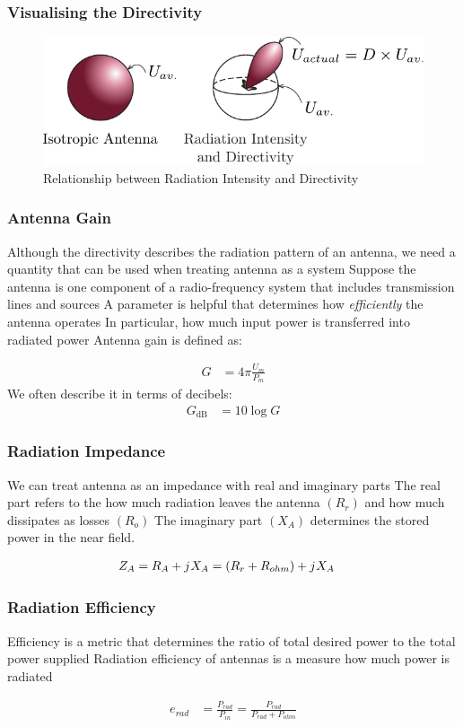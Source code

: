 \documentclass[10pt, compress]{beamer}
\renewcommand{\j}{{j}\mkern1mu} %
\begin{document}
\begin{frame}
  \frametitle{Visualising the Directivity}
  \begin{figure}
    \centering
    \includegraphics[width=.8\textwidth]{src/antenna_dir.pdf}
    \caption{Relationship between Radiation Intensity and Directivity}
  \end{figure}
\end{frame}


\begin{frame}
  \frametitle{Antenna Gain}
  \begin{outline}
    \1 Although the directivity describes the radiation pattern of an antenna, we need a quantity that can be used when treating antenna as a system
    \1 Suppose the antenna is one component of a radio-frequency system that includes transmission lines and sources
    \1 A parameter is helpful that determines how \textit{efficiently} the antenna operates
    \2 In particular, how much input power is transferred into radiated power
    \1 Antenna gain is defined as:
  \end{outline}
  \begin{align*}
    G &= 4 \pi \frac{U_m}{P_m}
  \end{align*}
  We often describe it in terms of decibels:
  \begin{align*}
    G_{\mathrm{dB}} &= 10 \log G
  \end{align*}
\end{frame}

\begin{frame}
  \frametitle{Radiation Impedance}
  \begin{outline}
    \1 We can treat antenna as an impedance with real and imaginary parts
    \2 The real part refers to the how much radiation leaves the antenna $(R_r)$ and how much dissipates as losses $(R_o)$
    \2 The imaginary part $(X_A)$ determines the stored power in the near field.
  \end{outline}
  \begin{align*}
    Z_A &= R_A + \j X_A = (R_r + R_{ohm}) + \j X_A
  \end{align*}
\end{frame}

\begin{frame}
  \frametitle{Radiation Efficiency}
  \begin{outline}
    \1 Efficiency is a metric that determines the ratio of total desired power to the total power supplied
    \1 Radiation efficiency of antennas is a measure how much power is radiated
  \end{outline}
  \begin{align*}
    e_{rad} &= \frac{P_{rad}}{P_{in}} = \frac{P_{rad}}{P_{rad} + P_{ohm}}
  \end{align*}
\end{frame}
\end{document}
